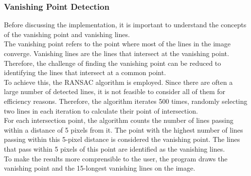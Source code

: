 \subsubsection*{Vanishing Point Detection}
\label{subsubsec:vanishing-point-detection}

Before discussing the implementation, it is important to understand the concepts of the vanishing point and vanishing lines. \\
The vanishing point refers to the point where most of the lines in the image converge. Vanishing lines are the lines that intersect at the vanishing point.
Therefore, the challenge of finding the vanishing point can be reduced to identifying the lines that intersect at a common point.\\
To achieve this, the RANSAC algorithm is employed. Since there are often a large number of detected lines,
it is not feasible to consider all of them for efficiency reasons.
Therefore, the algorithm iterates 500 times, randomly selecting two lines in each iteration to calculate their point of intersection.\\
For each intersection point, the algorithm counts the number of lines passing within a distance of 5 pixels from it.
The point with the highest number of lines passing within this 5-pixel distance is considered the vanishing point.
The lines that pass within 5 pixels of this point are identified as the vanishing lines.\\
To make the results more comprensible to the user, the program draws the vanishing point and the 15-longest vanishing lines on the image.
